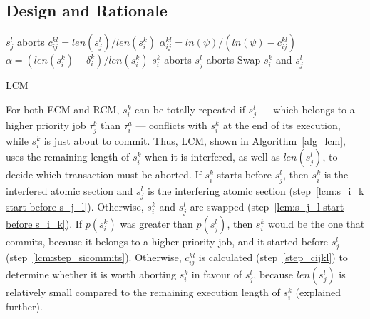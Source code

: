 \subsection{\label{sec 9.1}Design and Rationale}
%
\begin{algorithm}
\footnotesize{
\LinesNumbered
{}
{
	{$s_j^l$ aborts\label{lcm:step_sicommits}\;}
	{$c_{ij}^{kl}=len(s_j^l)/len(s_i^k)$\label{step_cijkl}\;
	$\alpha_{ij}^{kl}=ln(\psi)/(ln(\psi)-c_{ij}^{kl})$\label{step_alphaijkl}\;
	$\alpha=\left(len(s_i^k)-\delta_i^k\right)/len(s_i^k)$\label{step_alpha}\;
	{$s_i^k$ aborts\label{lcm:step_siaborts}\;}
	{$s_j^l$ aborts\label{step_sjaborts}\;}
	}
	}
	{
	Swap $s_i^k$ and $s_j^l$\label{lcm:s_j_l start before s_i_k}\;
	}
	}
\caption{LCM}
\label{alg_lcm}
\end{algorithm}
%
For both ECM and RCM, $s_{i}^{k}$ can be totally repeated if $s_{j}^{l}$ --- which belongs to a higher priority job $\tau_{j}^b$ than $\tau_{i}^a$ --- conflicts with $s_{i}^{k}$
at the end of its execution, while $s_{i}^{k}$ is just about
to commit. Thus, LCM, shown in Algorithm~\ref{alg_lcm}, uses the remaining length of $s_{i}^{k}$ when it is interfered,
as well as $len(s_{j}^{l})$, to decide which transaction must be aborted. If $s_i^k$ starts before $s_j^l$, then $s_i^k$ is the interfered atomic section and $s_j^l$ is the interfering atomic section (step~\ref{lcm:s_i_k start before s_j_l}). Otherwise, $s_i^k$ and $s_j^l$ are swapped (step~\ref{lcm:s_j_l start before s_i_k}). If $p\left(s_i^k\right)$ was greater than $p\left(s_j^l\right)$, then $s_i^k$ would be the one that commits, because it belongs to a higher priority job, and it started before $s_j^l$ (step~\ref{lcm:step_sicommits}). Otherwise, $c_{ij}^{kl}$ is calculated (step~\ref{step_cijkl}) to determine whether it is worth aborting $s_i^k$ in favour of $s_j^l$, because $len(s_j^l)$ is relatively small compared to the remaining execution length of $s_i^k$ (explained further).

